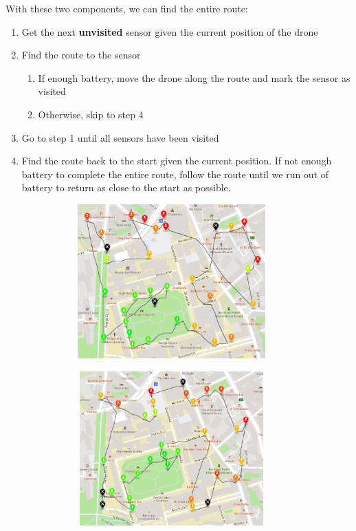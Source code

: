 \documentclass[11pt]{article}
\begin{document}
With these two components, we can find the entire route:
\begin{enumerate}[topsep=0pt, itemsep=0pt]
    \item Get the next \textbf{unvisited} sensor given the current position of the drone
    \item Find the route to the sensor
    \begin{enumerate}[topsep=0pt, itemsep=0pt]
        \item If enough battery, move the drone along the route and mark the sensor as visited
        \item Otherwise, skip to step 4
    \end{enumerate}
    \item Go to step 1 until all sensors have been visited
    \item Find the route back to the start given the current position. If not enough battery to complete the entire route, follow the route until we run out of battery to return as close to the start as possible.
\end{enumerate}


\begin{figure}[h]
    \centering
    \begin{minipage}{0.5\textwidth}
        \centering
        \includegraphics[width=0.95\textwidth, height=16em]{25-10-2021}
        \label{fig:example1}
    \end{minipage}%
    \begin{minipage}{0.5\textwidth}
        \centering
        \includegraphics[width=0.95\textwidth, height=16em]{26-12-2021}
        \label{fig:example2}
    \end{minipage}
\end{figure}
\end{document}
